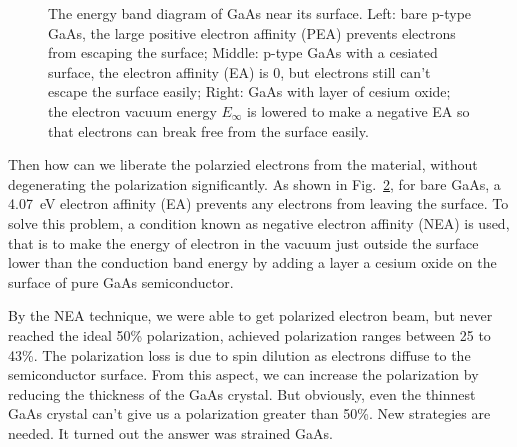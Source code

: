 \begin{figure}[h!]
\begin{subfigure}[b]{0.32\textwidth}
{
	}
	\label{fig:NEA}
    \end{subfigure}
    \caption{The energy band diagram of GaAs near its surface. 
    Left: bare p-type GaAs, the large positive electron affinity (PEA) 
    prevents electrons from escaping the surface; 
    Middle: p-type GaAs with a cesiated surface, the electron affinity (EA)
    is 0, but electrons still can't escape the surface easily; 
    Right: GaAs with layer of cesium oxide; the electron vacuum energy $E_\infty$ is
    lowered to make a negative EA so that electrons can break free from the surface
    easily. \cite{CARDMAN1992317}}
    \label{fig:electron_affinity}
\end{figure}
Then how can we liberate the polarzied electrons from the material, without 
degenerating the polarization significantly. As shown in Fig.~\ref{fig:electron_affinity},
for bare GaAs, a 4.07~eV electron affinity (EA) prevents any electrons from
leaving the surface. To solve this problem, a condition known as negative
electron affinity (NEA) is used, that is to make the energy of electron in 
the vacuum just outside the surface lower than the conduction band energy by
adding a layer a cesium oxide on the surface of pure GaAs semiconductor.

By the NEA technique, we were able to get polarized electron beam, but never
reached the ideal 50\% polarization, achieved polarization ranges between 25 to 43\%. 
The polarization loss is due to spin dilution as electrons diffuse to the 
semiconductor surface. From this aspect, we can increase the polarization by 
reducing the thickness of the GaAs crystal. But obviously, even the thinnest
GaAs crystal can't give us a polarization greater than 50\%. New strategies 
are needed. It turned out the answer was strained GaAs. \cite{CARDMAN1992317}


